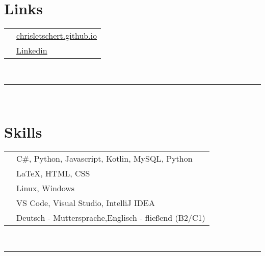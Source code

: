 \documentclass[oneside]{article}
\begin{document}
{\begin{minipage}[t][\textheight-2\fboxsep-2\fboxrule][t]{\dimexpr0.35\textwidth-2\fboxrule-2\fboxsep\relax}
        \section*{\large Links}
        \begin{tabular}{cl}  
            \faFirefox{}    & \href{https://chrisletschert.github.io}{chrisletschert.github.io} \\
            \faLinkedin{} & \href{https://www.linkedin.com/in/christian-l-b73699226/}{Linkedin} \\
        \end{tabular}
        \vspace{10pt} \\
        \rule{\linewidth}{0.4pt} \\
        \section*{\large Skills}
        \begin{tabularx}{\textwidth}{cY}
            \faCode{}        & C\#, Python, Javascript, Kotlin, MySQL, Python \\
            \faPen*{}        & \LaTeX, HTML, CSS \\
            \faCogs{}        & Linux, Windows\\
            \faLaptopCode{}  & VS Code, Visual Studio, \newline IntelliJ IDEA \\
            \faLanguage{}    & Deutsch - Muttersprache,\newline  Englisch - flie\ss end (B2/C1)\\
        \end{tabularx}
        \vspace{1pt} \\
        \rule{\linewidth}{0.4pt}
        \vfill
    \end{minipage}
}
\hfill
\end{document}
